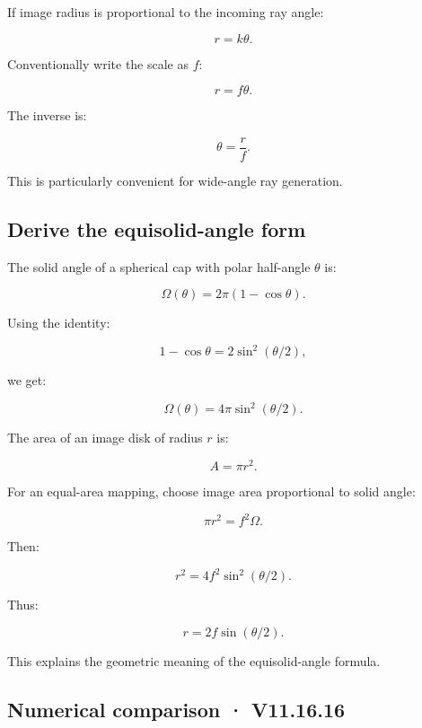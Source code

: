 \hypertarget{02-foundations-ii-ch035-derive-the-equidistant-mapping}{}

If image radius is proportional to the incoming ray angle:

\[ r=k\theta. \]

Conventionally write the scale as \(f\):

\[ \boxed{r=f\theta}. \]

The inverse is:

\[ \boxed{\theta=\frac rf}. \]

This is particularly convenient for wide-angle ray generation.

\subsection{Derive the equisolid-angle form}\label{02-foundations-ii-ch035-derive-the-equisolid-angle-form}

\hypertarget{02-foundations-ii-ch035-derive-the-equisolid-angle-form}{}

The solid angle of a spherical cap with polar half-angle \(\theta\) is:

\[ \boxed{ \Omega(\theta)=2\pi(1-\cos\theta). } \]

Using the identity:

\[ 1-\cos\theta=2\sin^2(\theta/2), \]

we get:

\[ \Omega(\theta)=4\pi\sin^2(\theta/2). \]

The area of an image disk of radius \(r\) is:

\[ A=\pi r^2. \]

For an equal-area mapping, choose image area proportional to solid angle:

\[ \pi r^2=f^2\Omega. \]

Then:

\[ r^2=4f^2\sin^2(\theta/2). \]

Thus:

\[ \boxed{ r=2f\sin(\theta/2). } \]

This explains the geometric meaning of the equisolid-angle formula.

\subsection{Numerical comparison · V11.16.16}\label{02-foundations-ii-ch035-numerical-comparison-v11.16.16}

\hypertarget{02-foundations-ii-ch035-numerical-comparison-v11.16.16}{}

